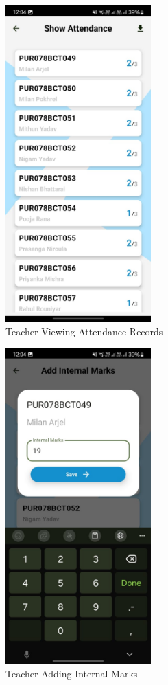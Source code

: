 \begin{figure}[H]
    \centering
    \includegraphics[width=0.5\textwidth]{Graphics/output/teacher_show_attendance.jpg}
    \caption{Teacher Viewing Attendance Records}
    \label{fig:teacher_show_attendance}
\end{figure}

\begin{figure}[H]
    \centering
    \includegraphics[width=0.5\textwidth]{Graphics/output/teacher_add_marks.jpg}
    \caption{Teacher Adding Internal Marks}
    \label{fig:teacher_add_marks}
\end{figure}

